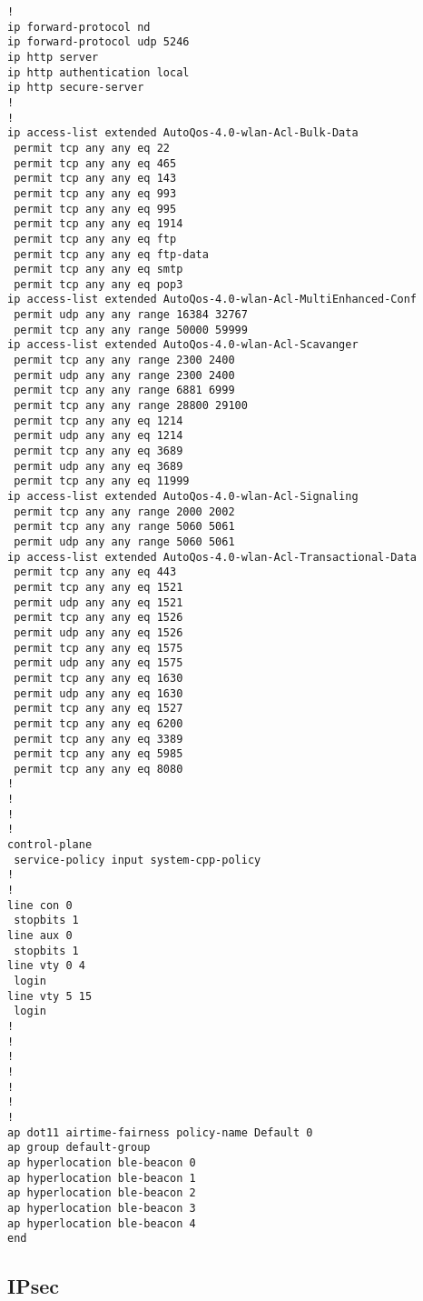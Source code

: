 \begin{verbatim}
!
ip forward-protocol nd
ip forward-protocol udp 5246
ip http server
ip http authentication local
ip http secure-server
!
!
ip access-list extended AutoQos-4.0-wlan-Acl-Bulk-Data
 permit tcp any any eq 22
 permit tcp any any eq 465
 permit tcp any any eq 143
 permit tcp any any eq 993
 permit tcp any any eq 995
 permit tcp any any eq 1914
 permit tcp any any eq ftp
 permit tcp any any eq ftp-data
 permit tcp any any eq smtp
 permit tcp any any eq pop3
ip access-list extended AutoQos-4.0-wlan-Acl-MultiEnhanced-Conf
 permit udp any any range 16384 32767
 permit tcp any any range 50000 59999
ip access-list extended AutoQos-4.0-wlan-Acl-Scavanger
 permit tcp any any range 2300 2400
 permit udp any any range 2300 2400
 permit tcp any any range 6881 6999
 permit tcp any any range 28800 29100
 permit tcp any any eq 1214
 permit udp any any eq 1214
 permit tcp any any eq 3689
 permit udp any any eq 3689
 permit tcp any any eq 11999
ip access-list extended AutoQos-4.0-wlan-Acl-Signaling
 permit tcp any any range 2000 2002
 permit tcp any any range 5060 5061
 permit udp any any range 5060 5061
ip access-list extended AutoQos-4.0-wlan-Acl-Transactional-Data
 permit tcp any any eq 443
 permit tcp any any eq 1521
 permit udp any any eq 1521
 permit tcp any any eq 1526
 permit udp any any eq 1526
 permit tcp any any eq 1575
 permit udp any any eq 1575
 permit tcp any any eq 1630
 permit udp any any eq 1630
 permit tcp any any eq 1527
 permit tcp any any eq 6200
 permit tcp any any eq 3389
 permit tcp any any eq 5985
 permit tcp any any eq 8080
!
!
!
!
control-plane
 service-policy input system-cpp-policy
!
!
line con 0
 stopbits 1
line aux 0
 stopbits 1
line vty 0 4
 login
line vty 5 15
 login
!
!
!
!
!
!
!
ap dot11 airtime-fairness policy-name Default 0
ap group default-group
ap hyperlocation ble-beacon 0
ap hyperlocation ble-beacon 1
ap hyperlocation ble-beacon 2
ap hyperlocation ble-beacon 3
ap hyperlocation ble-beacon 4
end

\end{verbatim}

\clearpage
\subsection{IPsec}\label{app:IPsec}
